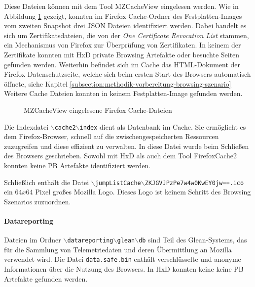 \begin{appendices}
{\begin{landscape}
\begin{table}[h!]
{\begin{tabular}{cllll}
	\end{tabular}
	}
	\end{table}
\end{landscape}
}
\restoregeometry
%

Diese Dateien können mit dem Tool MZCacheView eingelesen werden.
Wie in Abbildung \ref{img:mzcacheview} gezeigt, konnten im Firefox Cache-Ordner des Festplatten-Images vom zweiten Snapshot drei JSON Dateien identifiziert werden. Dabei handelt es sich um Zertifikatsdateien, die von der \textit{One Certificate Revocation List} stammen, ein Mechanismus von Firefox zur Überprüfung von Zertifikaten. In keinem der Zertifikate konnten mit HxD private Browsing Artefakte oder besuchte Seiten gefunden werden. \cite{TechSupportGuy.05.06.2023}
Weiterhin befindet sich im Cache das HTML-Dokument der Firefox Datenschutzseite, welche sich beim ersten Start des Browsers automatisch öffnete, siehe Kapitel \ref{subsection:methodik-vorbereitung-browsing-szenario}
Weitere Cache Dateien konnten in keinem Festplatten-Image gefunden werden.
\begin{figure}[h!]
	\caption{MZCacheView eingelesene Firefox Cache-Dateien}
	\label{img:mzcacheview}
\end{figure}
Die Indexdatei \texttt{$\backslash$cache2$\backslash$index} dient als Datenbank im Cache. Sie ermöglicht es dem Firefox-Browser, schnell auf die zwischengespeicherten Ressourcen zuzugreifen und diese effizient zu verwalten. In diese Datei wurde beim Schließen des Browsers geschrieben. Sowohl mit HxD als auch dem Tool FirefoxCache2 konnten keine PB Artefakte identifiziert werden.

Schließlich enthält die Datei \texttt{$\backslash$jumpListCache$\backslash$ZKJGVJPzPe7w4w0KwEY0jw==.ico} ein $64x64$ Pixel großes Mozilla Logo. Dieses Logo ist keinem Schritt des Browsing Szenarios zuzuordnen.


\paragraph*{Datareporting}
Dateien im Ordner \texttt{$\backslash$datareporting$\backslash$glean$\backslash$db} sind Teil des Glean-Systems, das für die Sammlung von Telemetriedaten und deren Übermittlung an Mozilla verwendet wird. \cite{GitHub.05.06.2023}
Die Datei \texttt{data.safe.bin} enthält verschlüsselte und anonyme Informationen über die Nutzung des Browsers. In HxD konnten keine keine PB Artefakte gefunden werden. 


\end{appendices}
